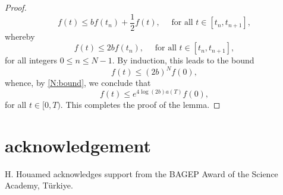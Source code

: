 \documentclass[11pt, leqno, a4paper,]{amsart}
\theoremstyle{remark}
\numberwithin{equation}{section}
\begin{document}
\begin{proof}
\begin{equation*}
		f(t) \leq b f(t_{n}) + \frac{1}{2} f(t), \quad \text{ for all } t\in [t_{n}, t_{n+1}],
	\end{equation*}
	whereby 
	\begin{equation*}
		f(t) \leq 2b f(t_{n}), \quad \text{ for all } t\in [t_{n}, t_{n+1}],
	\end{equation*}
	for all integers $0\leq n \leq N-1$. By induction, this leads to the bound 
	\begin{equation*}
		f(t) \leq (2b)^{N} f(0) , 
	\end{equation*}
	whence, by \eqref{N:bound}, we conclude that  
	\begin{equation*}
		f(t) \leq  e^{4 \log (2b) a(T)} f(0), 
	\end{equation*}
	 for all $t\in [0,T).$ This completes the proof of the lemma.
\end{proof}


\section*{acknowledgement} 

H. Houamed acknowledges support from the  BAGEP Award of the Science Academy, T\"urkiye.



	 
	 
\end{document}
